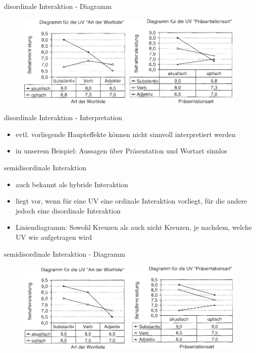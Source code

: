 \documentclass{beamer}
\begin{document}
	\begin{frame}{disordinale Interaktion - Diagramm}
		\begin{figure}
			\centering
			\includegraphics[width=1.0\textwidth]{Bilder/disordinaleI.png}
		\end{figure}
	\end{frame}
	
	\begin{frame}{disordinale Interaktion - Interpretation}
		\begin{itemize}
			\item evtl. vorliegende Haupteffekte können nicht sinnvoll interpretiert werden
			\item in unserem Beispiel: Aussagen über Präsentation und Wortart sinnlos
		\end{itemize}
	\end{frame}
	
	\begin{frame}{semidisordinale Interaktion}
		\begin{itemize}
			\item auch bekannt als hybride Interaktion
			\item liegt vor, wenn für eine UV eine ordinale Interaktion vorliegt, für die andere jedoch eine disordinale Interaktion
			\item Liniendiagramm: Sowohl Kreuzen als auch nicht Kreuzen, je nachdem, welche UV wie aufgetragen wird
		\end{itemize}
	\end{frame}
	
	\begin{frame}{semidisordinale Interaktion - Diagramm}
		\begin{figure}
			\centering
			\includegraphics[width=1.0\textwidth]{Bilder/semidisordinaleI.png}
		\end{figure}
	\end{frame}
	
\end{document}
